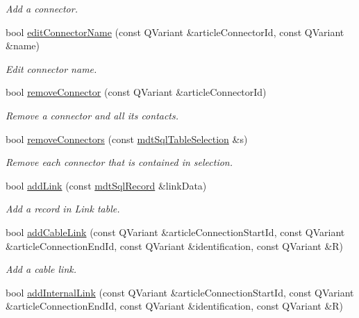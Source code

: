 \begin{DoxyCompactItemize}
\begin{DoxyCompactList}\small\item\em Add a connector. \end{DoxyCompactList}\item 
bool \hyperlink{classmdt_cl_article_aed8a2fc638636a618409694a655e9819}{edit\-Connector\-Name} (const Q\-Variant \&article\-Connector\-Id, const Q\-Variant \&name)
\begin{DoxyCompactList}\small\item\em Edit connector name. \end{DoxyCompactList}\item 
bool \hyperlink{classmdt_cl_article_aa675a24b08929b5efb4c421176b8bdde}{remove\-Connector} (const Q\-Variant \&article\-Connector\-Id)
\begin{DoxyCompactList}\small\item\em Remove a connector and all its contacts. \end{DoxyCompactList}\item 
bool \hyperlink{classmdt_cl_article_a85dbe6c2b85d00e0f479c477ee4b7653}{remove\-Connectors} (const \hyperlink{classmdt_sql_table_selection}{mdt\-Sql\-Table\-Selection} \&s)
\begin{DoxyCompactList}\small\item\em Remove each connector that is contained in selection. \end{DoxyCompactList}\item 
bool \hyperlink{classmdt_cl_article_aa438fa2c759a091341eea76ffda6eef3}{add\-Link} (const \hyperlink{classmdt_sql_record}{mdt\-Sql\-Record} \&link\-Data)
\begin{DoxyCompactList}\small\item\em Add a record in Link table. \end{DoxyCompactList}\item 
bool \hyperlink{classmdt_cl_article_a0ed8ad64cafb5b69c1f83875818136e5}{add\-Cable\-Link} (const Q\-Variant \&article\-Connection\-Start\-Id, const Q\-Variant \&article\-Connection\-End\-Id, const Q\-Variant \&identification, const Q\-Variant \&R)
\begin{DoxyCompactList}\small\item\em Add a cable link. \end{DoxyCompactList}\item 
bool \hyperlink{classmdt_cl_article_af432e7fd5ef37b47ae3915a84f154ceb}{add\-Internal\-Link} (const Q\-Variant \&article\-Connection\-Start\-Id, const Q\-Variant \&article\-Connection\-End\-Id, const Q\-Variant \&identification, const Q\-Variant \&R)

\end{DoxyCompactItemize}
